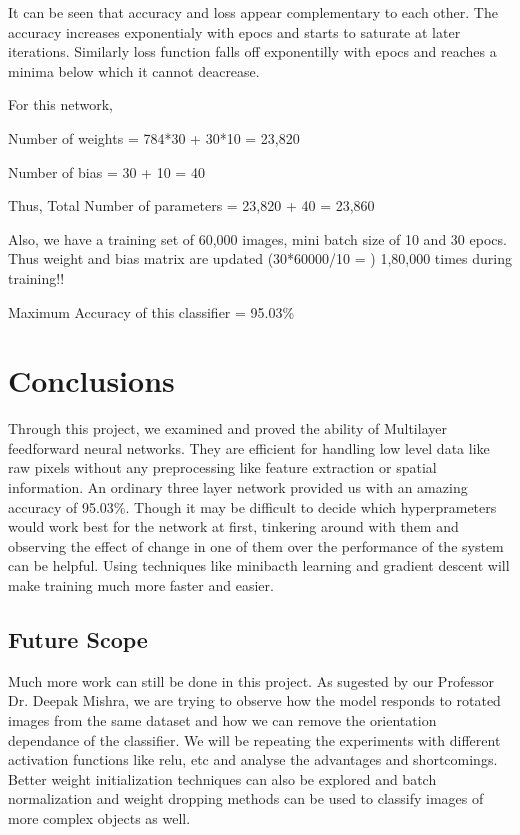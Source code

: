 \documentclass[conference]{IEEEtran}
\begin{document}
It can be seen that accuracy and loss appear complementary to each other. The accuracy increases exponentialy with epocs and starts to saturate at later iterations. Similarly loss function falls off exponentilly with epocs and reaches a minima below which it cannot deacrease.

For this network,

Number of weights = 784*30 + 30*10 = 23,820

Number of bias = 30 + 10 = 40

Thus, Total Number of parameters = 23,820 + 40 = 23,860

Also, we have a training set of 60,000 images, mini batch size of 10 and 30 epocs. Thus weight and bias matrix are updated (30*60000/10 = ) 1,80,000 times during training!!

Maximum Accuracy of this classifier = 95.03\%

\section{Conclusions}
Through this project, we examined and proved the ability of Multilayer feedforward neural networks. They are efficient for handling low level data like raw pixels without any preprocessing like feature extraction or spatial information. An ordinary three layer network provided us with an amazing accuracy of 95.03\%. Though it may be difficult to decide which hyperprameters would work best for the network at first, tinkering around with them and observing the effect of change in one of them over the performance of the system can be helpful. Using techniques like minibacth learning and gradient descent will make training much more faster and easier.

\subsection{Future Scope}
Much more work can still be done in this project. As sugested by our Professor Dr. Deepak Mishra, we are trying to observe how the model responds to rotated images from the same dataset and how we can remove the orientation dependance of the classifier. We will be repeating the experiments with different activation functions like relu, etc and analyse the advantages and shortcomings. Better weight initialization techniques can also be explored and batch normalization and weight dropping methods can be used to classify images of more complex objects as well.
\end{document}
